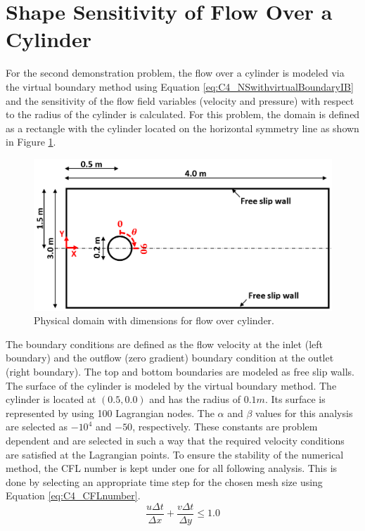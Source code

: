 \section{Shape Sensitivity of Flow Over a Cylinder}
For the second demonstration problem, the flow over a cylinder is modeled via the virtual boundary method using Equation \eqref{eq:C4_NSwithvirtualBoundaryIB} and the sensitivity of the flow field variables (velocity and pressure) with respect to the radius of the cylinder is calculated. For this problem, the domain is defined as a rectangle with the cylinder located on the horizontal symmetry line as shown in Figure \ref{fig:C4_cylinderPhysicalDomain}.
%
\begin{figure}[H]
    \centering
    \includegraphics[width=12.00cm]{Chapter_4/figure/flow_over_cylinder/flow_over_cylinder.png}
    \caption{Physical domain with dimensions for flow over cylinder.}
    \label{fig:C4_cylinderPhysicalDomain}
\end{figure}
%
The boundary conditions are defined as the flow velocity at the inlet (left boundary) and the outflow (zero gradient) boundary condition at the outlet (right boundary). The top and bottom boundaries are modeled as free slip walls. The surface of the cylinder is modeled by the virtual boundary method. The cylinder is located at $(0.5, 0.0)$ and has the radius of $0.1 m$. Its surface is represented by using 100 Lagrangian nodes. The $\alpha$ and $\beta$ values for this analysis are selected as $-10^4$ and $-50$, respectively. These constants are problem dependent and are selected in such a way that the required velocity conditions are satisfied at the Lagrangian points. To ensure the stability of the numerical method, the CFL number is kept under one for all following analysis. This is done by selecting an appropriate time step for the chosen mesh size using Equation \eqref{eq:C4_CFLnumber}.
%
\begin{equation}\label{eq:C4_CFLnumber}
	\frac{u \Delta t}{\Delta x} + \frac{v \Delta t}{\Delta y} \leq 1.0
\end{equation}

